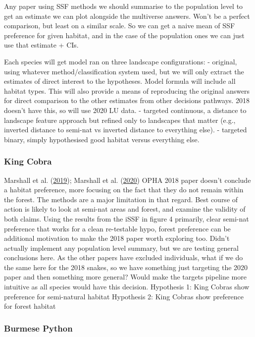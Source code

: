 \documentclass[10pt,a4paper]{article}
\begin{document}
Any paper using SSF methods we should summarise to the population level to get an estimate we can plot alongside the multiverse answers.
Won't be a perfect comparison, but least on a similar scale.
So we can get a naive mean of SSF preference for given habitat, and in the case of the population ones we can just use that estimate + CIs.

Each species will get model ran on three landscape configurations:
- original, using whatever method/classification system used, but we will only extract the estimates of direct interest to the hypotheses. Model formula will include all habitat types. This will also provide a means of reproducing the original answers for direct comparison to the other estimates from other decisions pathways. 2018 doesn't have this, so will use 2020 LU data.
- targeted continuous, a distance to landscape feature approach but refined only to landscapes that matter (e.g., inverted distance to semi-nat vs inverted distance to everything else).
- targeted binary, simply hypothesised good habitat versus everything else.

\hypertarget{king-cobra-1}{%
\subsubsection{King Cobra}\label{king-cobra-1}}

Marshall et al. (\protect\hyperlink{ref-Marshall2018}{2019}); Marshall et al. (\protect\hyperlink{ref-marshall_no_2020}{2020})
OPHA
2018 paper doesn't conclude a habitat preference, more focusing on the fact that they do not remain within the forest.
The methods are a major limitation in that regard.
Best course of action is likely to look at semi-nat areas and forest, and examine the validity of both claims.
Using the results from the iSSF in figure 4 primarily, clear semi-nat preference that works for a clean re-testable hypo, forest preference can be additional motivation to make the 2018 paper worth exploring too.
Didn't actually implement any population level summary, but we are testing general conclusions here.
As the other papers have excluded individuals, what if we do the same here for the 2018 snakes, so we have something just targeting the 2020 paper and then something more general? Would make the targets pipeline more intuitive as all species would have this decision.
Hypothesis 1: King Cobras show preference for semi-natural habitat
Hypothesis 2: King Cobras show preference for forest habitat

\hypertarget{burmese-python-1}{%
\subsubsection{Burmese Python}\label{burmese-python-1}}
\end{document}
